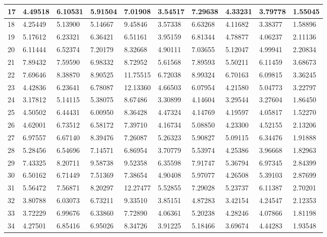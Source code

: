 \begin{table}[H]
{\begin{tabular}{|l|l|l|l|l|l|l|l|l|l|}
        17 & 4.49518 & 6.10531 & 5.91504 & 7.01908 & 3.54517 & 7.29638 & 4.33231 & 3.79778 & 1.55045 \\ \hline
        18 & 4.25449 & 5.13900 & 5.14667 & 9.45846 & 3.57338 & 6.63268 & 4.11682 & 3.38377 & 1.58896 \\ \hline
        19 & 5.17612 & 6.23321 & 6.36421 & 6.51161 & 3.95159 & 6.81344 & 4.78877 & 4.06237 & 2.11136 \\ \hline
        20 & 6.11444 & 6.52374 & 7.20179 & 8.32668 & 4.90111 & 7.03655 & 5.12047 & 4.99941 & 2.20834 \\ \hline
        21 & 7.89432 & 7.59590 & 6.98332 & 8.72952 & 5.61568 & 7.89593 & 5.50211 & 6.11459 & 3.68673 \\ \hline
        22 & 7.69646 & 8.38870 & 8.90525 & 11.75515 & 6.72038 & 8.99324 & 6.70163 & 6.09815 & 3.36245 \\ \hline
        23 & 4.42836 & 6.23641 & 6.78087 & 12.13360 & 4.66503 & 6.07954 & 4.21580 & 5.04773 & 3.22797 \\ \hline
        24 & 3.17812 & 5.14115 & 5.38075 & 8.67486 & 3.30899 & 4.14604 & 3.29544 & 3.27604 & 1.86450 \\ \hline
        25 & 4.50502 & 6.44431 & 6.00950 & 8.36428 & 4.47324 & 4.14769 & 4.19597 & 4.05817 & 1.52270 \\ \hline
        26 & 4.62001 & 6.73512 & 6.58172 & 7.39710 & 4.16734 & 5.08850 & 4.23300 & 4.52155 & 2.13206 \\ \hline
        27 & 6.97557 & 6.67140 & 8.39476 & 7.26087 & 5.26323 & 5.90827 & 5.09115 & 6.34476 & 1.91888 \\ \hline
        28 & 5.28456 & 6.54696 & 7.14571 & 6.86954 & 3.70779 & 5.53974 & 4.25386 & 3.96668 & 1.82963 \\ \hline
        29 & 7.43325 & 8.20711 & 9.58738 & 9.52358 & 6.35598 & 7.91747 & 5.36794 & 6.97345 & 2.84399 \\ \hline
        30 & 6.50162 & 6.71449 & 7.51369 & 7.38654 & 4.90408 & 5.97077 & 4.26508 & 5.39103 & 2.87699 \\ \hline
        31 & 5.56472 & 7.56871 & 8.20297 & 12.27477 & 5.52855 & 7.29028 & 5.23737 & 6.11387 & 2.70201 \\ \hline
        32 & 3.80788 & 6.03073 & 6.73211 & 9.33510 & 3.85151 & 4.87283 & 3.42154 & 4.24547 & 2.12353 \\ \hline
        33 & 3.72229 & 6.99676 & 6.33860 & 7.72890 & 4.06361 & 5.20238 & 4.28246 & 4.07866 & 1.81198 \\ \hline
        34 & 4.27501 & 6.85416 & 6.95026 & 8.34726 & 3.91225 & 5.18466 & 3.69674 & 4.44283 & 1.93548 \\ \hline

\end{tabular}}
\end{table}

